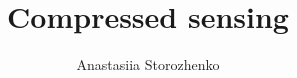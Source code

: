 \documentclass[12pt]{article}
\title{Compressed sensing}
\author{Anastasiia Storozhenko}
\theoremstyle{definition}
\theoremstyle{remark}
\numberwithin{equation}{section}
\begin{document}
    \maketitle

%

\listoftodos










%

    \nocite{*}
\printbibliography
\end{document}
